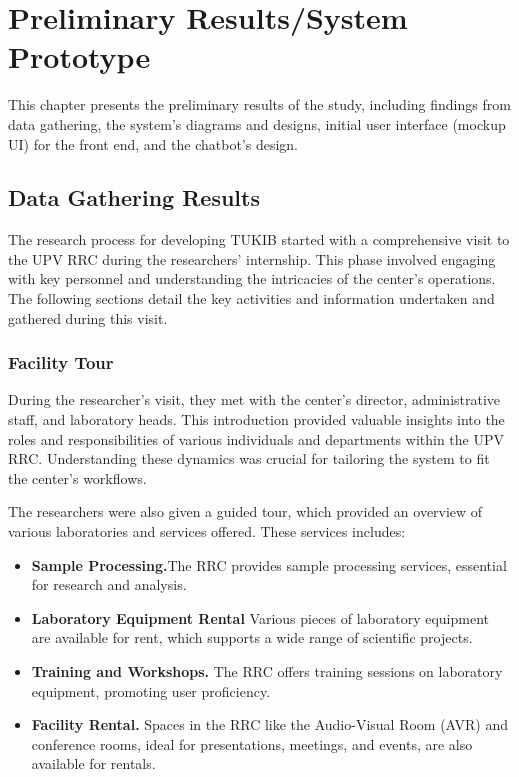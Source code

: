 \chapter{Preliminary Results/System Prototype}
This chapter presents the preliminary results of the study, including findings from data gathering, the system's diagrams and designs, initial user interface (mockup UI) for the front end, and the chatbot's design.

\section{Data Gathering Results}
The research process for developing TUKIB started with a comprehensive visit to the UPV RRC during the researchers' internship. This phase involved engaging with key personnel and understanding the intricacies of the center's operations. The following sections detail the key activities and information undertaken and gathered during this visit.

\subsection{Facility Tour}
During the researcher's visit, they met with the center's director, administrative staff, and laboratory heads. This introduction provided valuable insights into the roles and responsibilities of various individuals and departments within the UPV RRC. Understanding these dynamics was crucial for tailoring the system to fit the center’s workflows.

The researchers were also given a guided tour, which provided an overview of various laboratories and services offered. These services includes:

\begin{itemize}
	\item \textbf{Sample Processing.}The RRC provides sample processing services, essential for research and analysis.
	\item \textbf{Laboratory Equipment Rental} Various pieces of laboratory equipment are available for rent, which supports a wide range of scientific projects.
	\item \textbf{Training and Workshops.} The RRC offers training sessions on laboratory equipment, promoting user proficiency.
	\item \textbf{Facility Rental.} Spaces in the RRC like the Audio-Visual Room (AVR) and conference rooms, ideal for presentations, meetings, and events, are also available for rentals.
\end{itemize}


